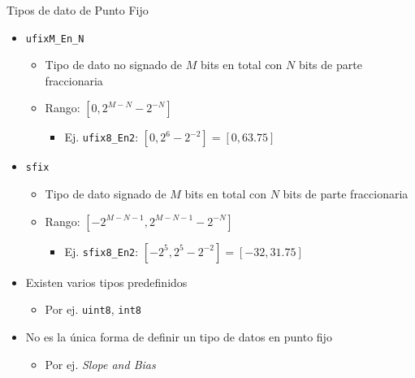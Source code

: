 \documentclass{beamer}
\begin{document}
\begin{frame}{Tipos de dato de Punto Fijo}
\begin{itemize}
	\item \texttt{ufixM\_En\_N}
	\begin{itemize}
		\item Tipo de dato no signado de $M$ bits en total con $N$ bits de parte fraccionaria 
		\item Rango: $\left[0, 2^{M-N}-2^{-N}\right]$ 
		\begin{itemize}
			\item Ej. \texttt{ufix8\_En2}: $\left[0, 2^{6}-2^{-2}\right] = \left[0, 63.75\right]$
		\end{itemize}
	\end{itemize}
	\item \texttt{sfix}
	\begin{itemize}
		\item Tipo de dato signado de $M$ bits en total con $N$ bits de parte fraccionaria 
		\item Rango: $\left[-2^{M-N-1}, 2^{M-N-1}-2^{-N}\right]$ 
		\begin{itemize}
			\item Ej. \texttt{sfix8\_En2}: $\left[-2^5, 2^5-2^{-2}\right] = \left[-32, 31.75\right]$
		\end{itemize}
	\end{itemize}
	\item Existen varios tipos predefinidos
	\begin{itemize}
		\item Por ej. \texttt{uint8}, \texttt{int8}
	\end{itemize}
	\item No es la única forma de definir un tipo de datos en punto fijo
	\begin{itemize}
		\item Por ej. \textit{Slope and Bias}
	\end{itemize}
\end{itemize}
\end{frame}
\end{document}
